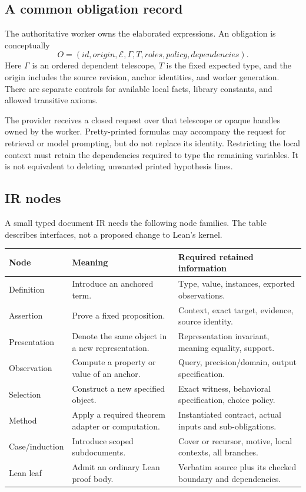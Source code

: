 \documentclass[11pt,a4paper]{article}
\theoremstyle{definition}
\begin{document}
\subsection{A common obligation record}
The authoritative worker owns the elaborated expressions. An obligation is
conceptually
\[
 O=(\mathit{id},\mathit{origin},\mathcal E,\Gamma,T,
       \mathit{roles},\mathit{policy},\mathit{dependencies}).
\]
Here \(\Gamma\) is an ordered dependent telescope, \(T\) is the fixed expected
type, and the origin includes the source revision, anchor identities, and worker
generation. There are separate controls for available local facts, library
constants, and allowed transitive axioms.

The provider receives a closed request over that telescope or opaque handles
owned by the worker. Pretty-printed formulas may accompany the request for
retrieval or model prompting, but do not replace its identity. Restricting the
local context must retain the dependencies required to type the remaining
variables. It is not equivalent to deleting unwanted printed hypothesis lines.

\subsection{IR nodes}
A small typed document IR needs the following node families. The table describes
interfaces, not a proposed change to Lean's kernel.

\begin{longtable}{@{}P{.18\textwidth}P{.35\textwidth}P{.39\textwidth}@{}}
\toprule
Node & Meaning & Required retained information\\
\midrule\endhead
Definition & Introduce an anchored term. & Type, value, instances, exported observations.\\
Assertion & Prove a fixed proposition. & Context, exact target, evidence, source identity.\\
Presentation & Denote the same object in a new representation. & Representation invariant, meaning equality, support.\\
Observation & Compute a property or value of an anchor. & Query, precision/domain, output specification.\\
Selection & Construct a new specified object. & Exact witness, behavioral specification, choice policy.\\
Method & Apply a required theorem adapter or computation. & Instantiated contract, actual inputs and sub-obligations.\\
Case/induction & Introduce scoped subdocuments. & Cover or recursor, motive, local contexts, all branches.\\
Lean leaf & Admit an ordinary Lean proof body. & Verbatim source plus its checked boundary and dependencies.\\
\bottomrule
\end{longtable}
\end{document}
